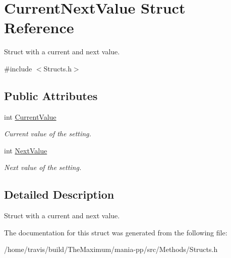 \hypertarget{structCurrentNextValue}{\section{Current\-Next\-Value Struct Reference}
\label{structCurrentNextValue}
}


Struct with a current and next value.  




{\ttfamily \#include $<$Structs.\-h$>$}

\subsection*{Public Attributes}
\begin{DoxyCompactItemize}
\item 
\hypertarget{structCurrentNextValue_adf3172ed773e285e652b49735ae63f8f}{int \hyperlink{structCurrentNextValue_adf3172ed773e285e652b49735ae63f8f}{Current\-Value}}\label{structCurrentNextValue_adf3172ed773e285e652b49735ae63f8f}

\begin{DoxyCompactList}\small\item\em Current value of the setting. \end{DoxyCompactList}\item 
\hypertarget{structCurrentNextValue_a44221ded20d57b79e0a76e3424c511bb}{int \hyperlink{structCurrentNextValue_a44221ded20d57b79e0a76e3424c511bb}{Next\-Value}}\label{structCurrentNextValue_a44221ded20d57b79e0a76e3424c511bb}

\begin{DoxyCompactList}\small\item\em Next value of the setting. \end{DoxyCompactList}\end{DoxyCompactItemize}


\subsection{Detailed Description}
Struct with a current and next value. 

The documentation for this struct was generated from the following file\-:\begin{DoxyCompactItemize}
\item 
/home/travis/build/\-The\-Maximum/mania-\/pp/src/\-Methods/Structs.\-h\end{DoxyCompactItemize}
